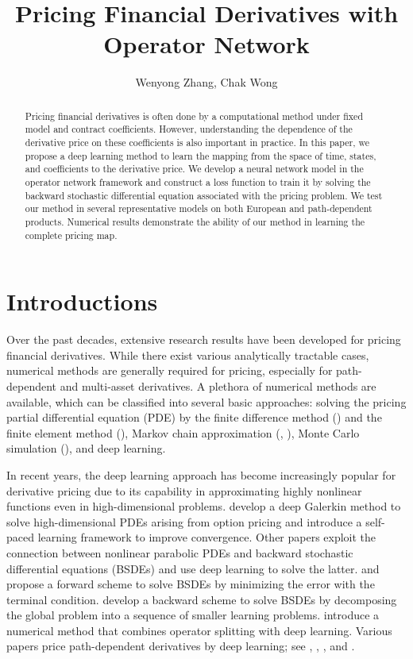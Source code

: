 \documentclass[11pt,a4paper]{article}
\title{Pricing Financial Derivatives with Operator Network}
\author{Wenyong Zhang, Chak Wong}
\theoremstyle{remark}
\begin{document}
	
	\maketitle
	
	\begin{abstract}
		Pricing financial derivatives is often done by a computational method under fixed model and contract coefficients. However, understanding the dependence of the derivative price on these coefficients is also important in practice. In this paper, we propose a deep learning method to learn the mapping from the space of time, states, and coefficients to the derivative price. We develop a neural network model in the operator network framework and construct a loss function to train it by solving the backward stochastic differential equation associated with the pricing problem. We test our method in several representative models on both European and path-dependent products. Numerical results demonstrate the ability of our method in learning the complete pricing map.       
	\end{abstract}
	
	\section{Introductions}
	Over the past decades, extensive research results have been developed for pricing financial derivatives. While there exist various analytically tractable cases, numerical methods are generally required for pricing, especially for path-dependent and multi-asset derivatives. A plethora of numerical methods are available, which can be classified into several basic approaches: solving the pricing partial differential equation (PDE) by the finite difference method (\cite{duffy2013finite}) and the finite element method (\cite{hilber2013computational}), Markov chain approximation (\cite{mijatovic2013continuously}, \cite{zhang2019analysis}), Monte Carlo simulation (\cite{glasserman2004monte}), and deep learning.
	
	In recent years, the deep learning approach has become increasingly popular for derivative pricing due to its capability in approximating highly nonlinear functions even in high-dimensional problems. \cite{sirignano2018dgm} develop a deep Galerkin method to solve high-dimensional PDEs arising from option pricing and \cite{gu2021selectnet} introduce a self-paced learning framework to improve convergence. Other papers exploit the connection between nonlinear parabolic PDEs and backward stochastic differential equations (BSDEs) and use deep learning to solve the latter. \cite{han2017deep} and \cite{han2018solving} propose a forward scheme to solve BSDEs by minimizing the error with the terminal condition. 
	\cite{hure2020deep} develop a backward scheme to solve BSDEs by decomposing the global problem into a sequence of smaller learning problems. \cite{beck2021deep} introduce a numerical method that combines operator splitting with deep learning. Various papers price path-dependent derivatives by deep learning; see \cite{jacquier2019deep}, \cite{sabate2020solving}, \cite{feng2021deep}, and \cite{liang2021deep}.
	
\end{document}
